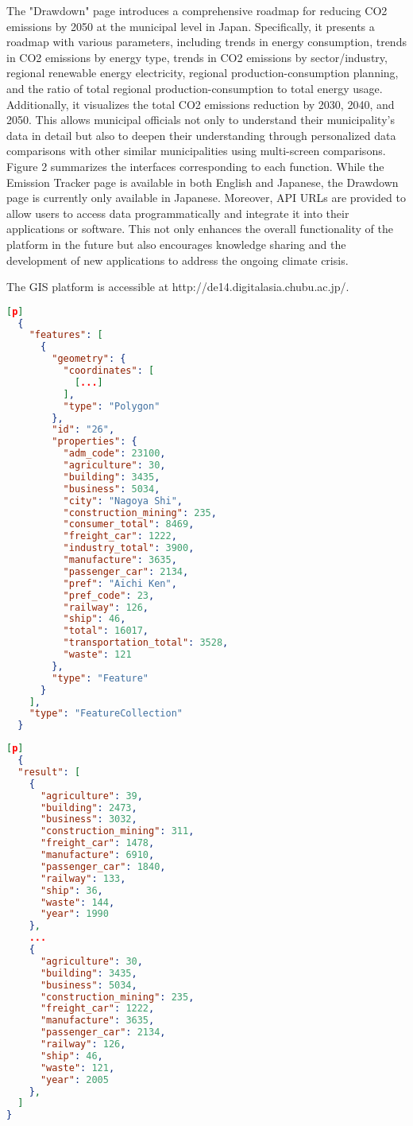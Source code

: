 The "Drawdown" page introduces a comprehensive roadmap for reducing CO2 emissions by 2050 at the municipal level in Japan. Specifically, it presents a roadmap with various parameters, including trends in energy consumption, trends in CO2 emissions by energy type, trends in CO2 emissions by sector/industry, regional renewable energy electricity, regional production-consumption planning, and the ratio of total regional production-consumption to total energy usage. Additionally, it visualizes the total CO2 emissions reduction by 2030, 2040, and 2050. This allows municipal officials not only to understand their municipality's data in detail but also to deepen their understanding through personalized data comparisons with other similar municipalities using multi-screen comparisons. Figure 2 summarizes the interfaces corresponding to each function. While the Emission Tracker page is available in both English and Japanese, the Drawdown page is currently only available in Japanese. Moreover, API URLs are provided to allow users to access data programmatically and integrate it into their applications or software. This not only enhances the overall functionality of the platform in the future but also encourages knowledge sharing and the development of new applications to address the ongoing climate crisis. \par
The GIS platform is accessible at http://de14.digitalasia.chubu.ac.jp/.\par

\begin{lstlisting}[language=json,firstnumber=1][p]
  {
    "features": [
      {
        "geometry": {
          "coordinates": [
            [...]
          ],
          "type": "Polygon"
        },
        "id": "26",
        "properties": {
          "adm_code": 23100,
          "agriculture": 30,
          "building": 3435,
          "business": 5034,
          "city": "Nagoya Shi",
          "construction_mining": 235,
          "consumer_total": 8469,
          "freight_car": 1222,
          "industry_total": 3900,
          "manufacture": 3635,
          "passenger_car": 2134,
          "pref": "Aichi Ken",
          "pref_code": 23,
          "railway": 126,
          "ship": 46,
          "total": 16017,
          "transportation_total": 3528,
          "waste": 121
        },
        "type": "Feature"
      }
    ],
    "type": "FeatureCollection"
  }
\end{lstlisting}
\begin{lstlisting}[language=json,firstnumber=1][p]
  {
  "result": [
    {
      "agriculture": 39,
      "building": 2473,
      "business": 3032,
      "construction_mining": 311,
      "freight_car": 1478,
      "manufacture": 6910,
      "passenger_car": 1840,
      "railway": 133,
      "ship": 36,
      "waste": 144,
      "year": 1990
    },
    ...
    {
      "agriculture": 30,
      "building": 3435,
      "business": 5034,
      "construction_mining": 235,
      "freight_car": 1222,
      "manufacture": 3635,
      "passenger_car": 2134,
      "railway": 126,
      "ship": 46,
      "waste": 121,
      "year": 2005
    },
  ]
}
\end{lstlisting}



